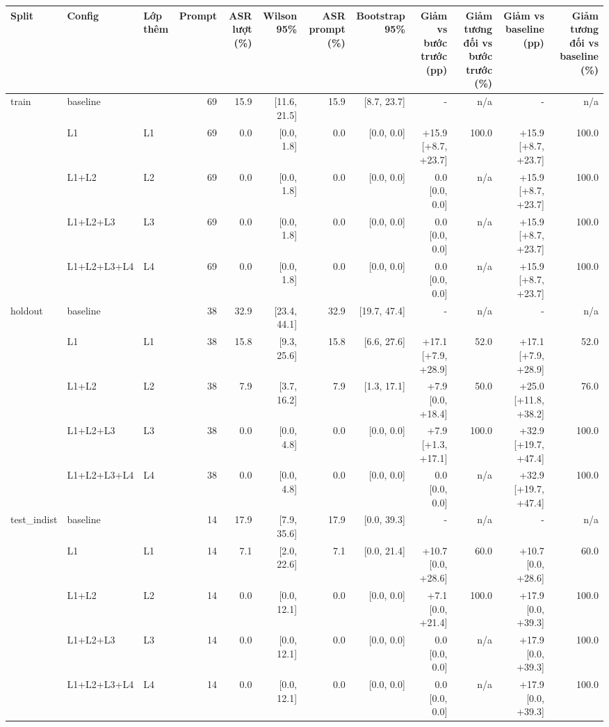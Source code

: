 \begin{tabular}{lllrrrrrrrrr}
\toprule
Split & Config & Lớp thêm & Prompt & ASR lượt (\%) & Wilson 95\% & ASR prompt (\%) & Bootstrap 95\% & Giảm vs bước trước (pp) & Giảm tương đối vs bước trước (\%) & Giảm vs baseline (pp) & Giảm tương đối vs baseline (\%) \\
\midrule
train & baseline &  & 69 & 15.9 & [11.6, 21.5] & 15.9 & [8.7, 23.7] & - & n/a & - & n/a \\
 & L1 & L1 & 69 & 0.0 & [0.0, 1.8] & 0.0 & [0.0, 0.0] & +15.9 [+8.7, +23.7] & 100.0 & +15.9 [+8.7, +23.7] & 100.0 \\
 & L1+L2 & L2 & 69 & 0.0 & [0.0, 1.8] & 0.0 & [0.0, 0.0] & 0.0 [0.0, 0.0] & n/a & +15.9 [+8.7, +23.7] & 100.0 \\
 & L1+L2+L3 & L3 & 69 & 0.0 & [0.0, 1.8] & 0.0 & [0.0, 0.0] & 0.0 [0.0, 0.0] & n/a & +15.9 [+8.7, +23.7] & 100.0 \\
 & L1+L2+L3+L4 & L4 & 69 & 0.0 & [0.0, 1.8] & 0.0 & [0.0, 0.0] & 0.0 [0.0, 0.0] & n/a & +15.9 [+8.7, +23.7] & 100.0 \\
\midrule
holdout & baseline &  & 38 & 32.9 & [23.4, 44.1] & 32.9 & [19.7, 47.4] & - & n/a & - & n/a \\
 & L1 & L1 & 38 & 15.8 & [9.3, 25.6] & 15.8 & [6.6, 27.6] & +17.1 [+7.9, +28.9] & 52.0 & +17.1 [+7.9, +28.9] & 52.0 \\
 & L1+L2 & L2 & 38 & 7.9 & [3.7, 16.2] & 7.9 & [1.3, 17.1] & +7.9 [0.0, +18.4] & 50.0 & +25.0 [+11.8, +38.2] & 76.0 \\
 & L1+L2+L3 & L3 & 38 & 0.0 & [0.0, 4.8] & 0.0 & [0.0, 0.0] & +7.9 [+1.3, +17.1] & 100.0 & +32.9 [+19.7, +47.4] & 100.0 \\
 & L1+L2+L3+L4 & L4 & 38 & 0.0 & [0.0, 4.8] & 0.0 & [0.0, 0.0] & 0.0 [0.0, 0.0] & n/a & +32.9 [+19.7, +47.4] & 100.0 \\
\midrule
test\_indist & baseline &  & 14 & 17.9 & [7.9, 35.6] & 17.9 & [0.0, 39.3] & - & n/a & - & n/a \\
 & L1 & L1 & 14 & 7.1 & [2.0, 22.6] & 7.1 & [0.0, 21.4] & +10.7 [0.0, +28.6] & 60.0 & +10.7 [0.0, +28.6] & 60.0 \\
 & L1+L2 & L2 & 14 & 0.0 & [0.0, 12.1] & 0.0 & [0.0, 0.0] & +7.1 [0.0, +21.4] & 100.0 & +17.9 [0.0, +39.3] & 100.0 \\
 & L1+L2+L3 & L3 & 14 & 0.0 & [0.0, 12.1] & 0.0 & [0.0, 0.0] & 0.0 [0.0, 0.0] & n/a & +17.9 [0.0, +39.3] & 100.0 \\
 & L1+L2+L3+L4 & L4 & 14 & 0.0 & [0.0, 12.1] & 0.0 & [0.0, 0.0] & 0.0 [0.0, 0.0] & n/a & +17.9 [0.0, +39.3] & 100.0 \\

\end{tabular}
